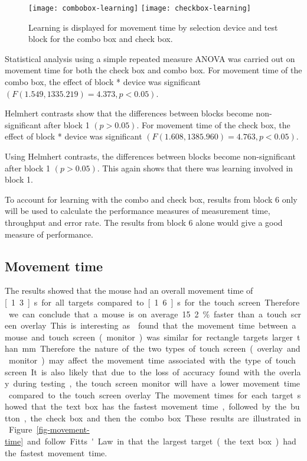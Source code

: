\documentclass{elsart}
\begin{document}
\begin{figure}
	\centering
	\texttt{[image: combobox-learning]}
	\texttt{[image: checkbox-learning]}
	\caption{Learning is displayed for movement time by selection device
	and test block for the combo box and check box.}
	\label{fig-movement-time-learning}
\end{figure}

Statistical analysis using a simple repeated measure ANOVA was carried
out on movement time for both the check box and combo box. For movement
time of the combo box, the effect of block * device was significant
\((F(1.549, 1335.219) = 4.373, p < 0.05)\).

Helmhert contrasts show that the differences between blocks become
non-significant after block 1 \((p > 0.05)\). For movement time of the
check box, the effect of block * device was significant \((F(1.608,
1385.960) = 4.763, p < 0.05)\).

Using Helmhert contrasts, the differences between blocks become
non-significant after block 1 \((p > 0.05)\). This again shows that
there was learning involved in block 1.

To account for learning with the combo and check box, results from block
6 only will be used to calculate the performance measures of measurement
time, throughput and error rate. The results from block 6 alone would
give a good measure of performance.

\subsection{Movement time}
\label{sec-results-movement}

The results showed that the mouse had an overall movement time of
\unit[1.3]{s} for all targets compared to \unit[1.6]{s} for the touch
screen. Therefore we can conclude that a mouse is on average 15.2\%
faster than a touch screen overlay. This is interesting as
\citet{Sear-A-1991-IJMMS} found that the movement time between a mouse
and touch screen (monitor) was similar for rectangle targets larger than
\unit[2]{mm}. Therefore the nature of the two types of touch screen
(overlay and monitor) may affect the movement time associated with the
type of touch screen. It is also likely that due to the loss of accuracy
found with the overlay during testing, the touch screen monitor will
have a lower movement time compared to the touch screen overlay.

The movement times for each target showed that the text box has the
fastest movement time, followed by the button, the check box and then
the combo box. These results are illustrated in
Figure~\ref{fig-movement-time} and follow Fitts' Law in that the largest
target (the text box) had the fastest movement time.
\end{document}
